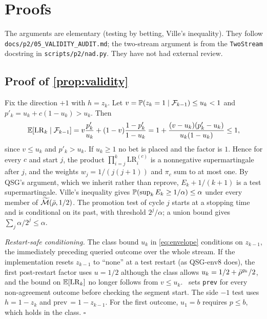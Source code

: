 \section{Proofs}\label{app:proofs}

The arguments are elementary (testing by betting, Ville's inequality). They follow
\texttt{docs/p2/05\_VALIDITY\_AUDIT.md}; the two-stream argument is from the \texttt{TwoStream}
docstring in \texttt{scripts/p2/nad.py}. They have not had external review.

\subsection{Proof of \cref{prop:validity}}
Fix the direction $+1$ with $h=z_k$. Let $v=\mathbb{P}(z_k=1\mid\mathcal{F}_{k-1})\le u_k<1$ and
$p'_k=u_k+c(1-u_k)>u_k$. Then
\[
\mathbb{E}[\mathrm{LR}_k\mid\mathcal{F}_{k-1}]=v\frac{p'_k}{u_k}+(1-v)\frac{1-p'_k}{1-u_k}
=1+\frac{(v-u_k)(p'_k-u_k)}{u_k(1-u_k)}\le 1,
\]
since $v\le u_k$ and $p'_k>u_k$. If $u_k\ge1$ no bet is placed and the factor is $1$. Hence for every
$c$ and start $j$, the product $\prod_{i=j}^{k}\mathrm{LR}_i^{(c)}$ is a nonnegative supermartingale
after $j$, and the weights $w_j=1/(j(j+1))$ and $\pi_c$ sum to at most one. By QSG's argument, which we
inherit rather than reprove, $E_k+1/(k+1)$ is a test supermartingale. Ville's inequality gives
$\mathbb{P}(\sup_kE_k\ge1/\alpha)\le\alpha$ under every member of $\widetilde{\mathcal M}(\bar\rho,1/2)$. The
promotion test of cycle $j$ starts at a stopping time and is conditional on its past, with threshold
$2^j/\alpha$; a union bound gives $\sum_j\alpha/2^j\le\alpha$.

\emph{Restart-safe conditioning.} The class bound $u_k$ in \eqref{eq:envelope} conditions on $z_{k-1}$,
the immediately preceding queried outcome over the whole stream. If the implementation resets
$z_{k-1}$ to ``none'' at a test restart (as QSG-env8 does), the first post-restart factor uses
$u=1/2$ although the class allows $u_k=1/2+\bar\rho^{g_k}/2$, and the bound on $\mathbb{E}[\mathrm{LR}_k]$ no
longer follows from $v\le u_k$. \NAD\ sets \texttt{prev} for every non-agreement outcome before
checking the segment start. The side $-1$ test uses $h=1-z_k$ and prev$\,=1-z_{k-1}$. For the first
outcome, $u_1=b$ requires $p\le b$, which holds in the class. $\square$

